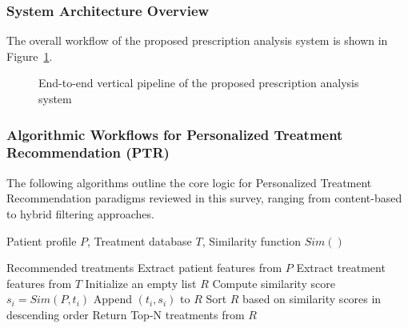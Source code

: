 \documentclass[conference]{IEEEtran}
\newcommand{\REQUIRE}{\item[\textbf{Require:}]}
\newcommand{\ENSURE}{\item[\textbf{Ensure:}]}
\begin{document}
\subsubsection{System Architecture Overview}

The overall workflow of the proposed prescription analysis system is shown in Figure~\ref{fig:pipeline}.


\begin{figure}[H]
\centering


\caption{End-to-end vertical pipeline of the proposed prescription analysis system}
\label{fig:pipeline}
\end{figure}

\subsubsection{Algorithmic Workflows for Personalized Treatment Recommendation (PTR)}

The following algorithms outline the core logic for Personalized Treatment Recommendation paradigms reviewed in this survey, ranging from content-based to hybrid filtering approaches.

\vspace{0.5em}

\begin{algorithm}[H]
\caption{Content-based filtering model for treatment recommendation}
\label{alg:content_based}
\begin{algorithmic}[1]
\REQUIRE Patient profile $P$, Treatment database $T$, Similarity function $Sim()$ \ENSURE Recommended treatments
\STATE Extract patient features from $P$
\STATE Extract treatment features from $T$
\STATE Initialize an empty list $R$
    \STATE Compute similarity score $s_i = Sim(P, t_i)$
    \STATE Append $(t_i, s_i)$ to $R$
\ENDFOR
\STATE Sort $R$ based on similarity scores in descending order
\STATE Return Top-N treatments from $R$
\end{algorithmic}
\end{algorithm}
\end{document}
